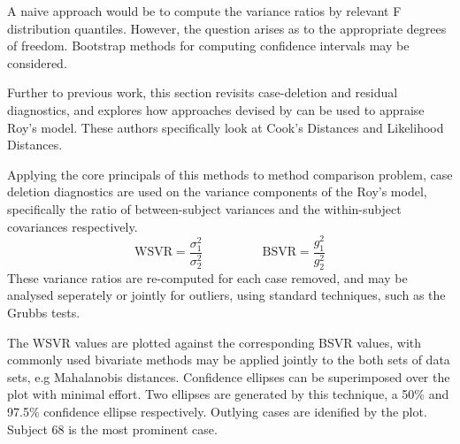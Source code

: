 \documentclass[12pt, a4paper]{report}
\theoremstyle{definition}
\theoremstyle{remark}
\begin{document}
A naive approach would be to compute the variance ratios by relevant F distribution quantiles. However, the question arises as to the appropriate degrees of freedom. Bootstrap methods for computing confidence intervals may be considered.

Further to previous work, this section revisits case-deletion and residual diagnostics, and explores how approaches devised by \citet{Galecki} can be used to appraise Roy's model. These authors specifically look at Cook's Distances and Likelihood Distances.

Applying the core principals of this methods to method comparison problem, case deletion diagnostics are used on the variance components of the Roy's model, specifically the ratio of between-subject variances and the within-subject covariances respectively.
\[ \mbox{WSVR} = \frac{\sigma^2_1}{\sigma^2_2} \phantom{makespace}  \mbox{BSVR} = \frac{g^2_1}{g^2_2} \]
These variance ratios are re-computed for each case removed, and may be analysed seperately or jointly for outliers, using standard techniques, such as the Grubbs tests.


The WSVR values are plotted against the corresponding BSVR values, with commonly used bivariate methods may be applied jointly to the both sets of data sets, e.g Mahalanobis distances. Confidence ellipses can be superimposed over the plot with minimal effort. Two ellipses are generated by this technique, a 50\% and 97.5\% confidence ellipse respectively. Outlying cases are idenified by the plot. Subject 68 is the most prominent case.
\end{document}
